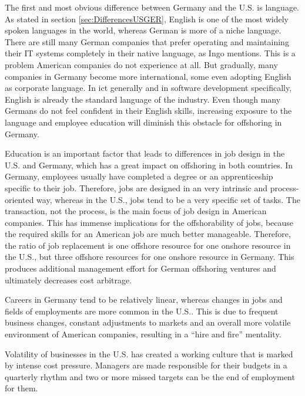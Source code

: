 The first and most obvious difference between Germany and the U.S. is language. As stated in section \ref{sec:DifferencesUSGER}, English is one of the most widely spoken languages in the world, whereas German is more of a niche language. There are still many German companies that prefer operating and maintaining their IT systems completely in their native language, as Ingo mentions. This is a problem American companies do not experience at all. But gradually, many companies in Germany become more international, some even adopting English as corporate language. In \gls{ict} generally and in software development specifically, English is already the standard language of the industry. Even though many Germans do not feel confident in their English skills, increasing exposure to the language and employee education will diminish this obstacle for offshoring in Germany.

Education is an important factor that leads to differences in job design in the U.S. and Germany, which has a great impact on offshoring in both countries. In Germany, employees usually have completed a degree or an apprenticeship specific to their job. Therefore, jobs are designed in an very intrinsic and process-oriented way, whereas in the U.S., jobs tend to be a very specific set of tasks. The transaction, not the process, is the main focus of job design in American companies. This has immense implications for the offshorability of jobs, because the required skills for an American job are much better manageable. Therefore, the ratio of job replacement is one offshore resource for one onshore resource in the U.S., but three offshore resources for one onshore resource in Germany. This produces additional management effort for German offshoring ventures and ultimately decreases cost arbitrage.

Careers in Germany tend to be relatively linear, whereas changes in jobs and fields of employments are more common in the U.S.. This is due to frequent business changes, constant adjustments to markets and an overall more volatile environment of American companies, resulting in a ``hire and fire'' mentality. 

Volatility of businesses in the U.S. has created a working culture that is marked by intense cost pressure. Managers are made responsible for their budgets in a quarterly rhythm and two or more missed targets can be the end of employment for them.


